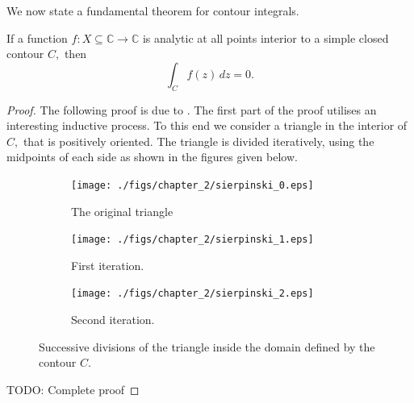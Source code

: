 \documentclass[12pt]{book}
\begin{document}
We now state a fundamental theorem for contour integrals.
\begin{thm}
    If a function $f: X \subseteq \mathbb{C} \rightarrow \mathbb{C}$ is analytic at all points interior to a simple closed contour $C,$ then
    \[
        \int_{C} f(z)\,dz = 0.
    \]
\end{thm}
\begin{proof}
    The following proof is due to \cite{Stein2003}. The first part of the proof utilises an interesting inductive process. To this end we consider a triangle in the interior of $C,$ that is positively oriented. The triangle is divided iteratively, using the midpoints of each side as shown in the figures given below.
    \begin{figure}[H]
        \centering
        \begin{subfigure}{0.30\textwidth}
            \centering
            \texttt{[image: ./figs/chapter\_2/sierpinski\_0.eps]}
            \caption{The original triangle}
        \end{subfigure}
        \qquad
        \begin{subfigure}{0.30\textwidth}
            \centering
            \texttt{[image: ./figs/chapter\_2/sierpinski\_1.eps]}
            \caption{First iteration.}
        \end{subfigure}
        \qquad
        \begin{subfigure}{0.30\textwidth}
            \centering
            \texttt{[image: ./figs/chapter\_2/sierpinski\_2.eps]}
            \caption{Second iteration.}
        \end{subfigure}
        \caption{Successive divisions of the triangle inside the domain defined by the contour $C.$}
    \end{figure}
    {\color{red} TODO: Complete proof}
\end{proof}
\end{document}
